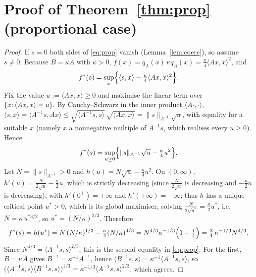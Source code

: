 \documentclass{amsart}
\theoremstyle{definition}
\begin{document}
\section{Proof of Theorem~\ref{thm:prop} (proportional case)}

\begin{proof}
If $s=0$ both sides of \eqref{eq:prop} vanish (Lemma~\ref{lem:coerc}), so assume $s\neq0$.
Because $B=\kappa A$ with $\kappa>0$, $f(x)=q_A(x)\,\kappa q_A(x)=\tfrac\kappa4\langle Ax,x\rangle^2$,
and
\[
f^\ast(s)=\sup_{x}\Bigl\{\langle s,x\rangle-\tfrac\kappa4\langle Ax,x\rangle^2\Bigr\}.
\]
Fix the value $u:=\langle Ax,x\rangle\ge0$ and maximise the linear term over $\{x:\langle Ax,x\rangle=u\}$.
By Cauchy--Schwarz in the inner product $\langle A\cdot,\cdot\rangle$,
$\langle s,x\rangle=\langle A^{-1}s,Ax\rangle\le\sqrt{\langle A^{-1}s,s\rangle}\,\sqrt{\langle Ax,x\rangle}
=\|s\|_{A^{-1}}\sqrt{u}$,
with equality for a suitable $x$ (namely $x$ a nonnegative multiple of $A^{-1}s$, which realises
every $u\ge0$).  Hence
\[
f^\ast(s)=\sup_{u\ge0}\Bigl\{\|s\|_{A^{-1}}\sqrt{u}-\tfrac\kappa4 u^2\Bigr\}.
\]
Let $N=\|s\|_{A^{-1}}>0$ and $h(u)=N\sqrt u-\tfrac\kappa4u^2$.  On $(0,\infty)$,
$h'(u)=\tfrac{N}{2\sqrt u}-\tfrac\kappa2 u$, which is strictly decreasing (since
$\frac{N}{2\sqrt u}$ is decreasing and $-\frac\kappa2u$ is decreasing), with $h'(0^+)=+\infty$ and
$h'(+\infty)=-\infty$; thus $h$ has a unique critical point $u^\ast>0$, which is its global
maximiser, solving $\tfrac{N}{2\sqrt{u^\ast}}=\tfrac\kappa2 u^\ast$, i.e.\
$N=\kappa\,u^{\ast 3/2}$, so $u^\ast=(N/\kappa)^{2/3}$.  Therefore
\[
f^\ast(s)=h(u^\ast)=N\,(N/\kappa)^{1/3}-\tfrac\kappa4(N/\kappa)^{4/3}
=N^{4/3}\kappa^{-1/3}\Bigl(1-\tfrac14\Bigr)=\tfrac34\,\kappa^{-1/3}N^{4/3}.
\]
Since $N^{4/3}=\langle A^{-1}s,s\rangle^{2/3}$, this is the second equality in \eqref{eq:prop}.
For the first, $B=\kappa A$ gives $B^{-1}=\kappa^{-1}A^{-1}$, hence
$\langle B^{-1}s,s\rangle=\kappa^{-1}\langle A^{-1}s,s\rangle$, so
$\bigl(\langle A^{-1}s,s\rangle\langle B^{-1}s,s\rangle\bigr)^{1/3}
=\kappa^{-1/3}\langle A^{-1}s,s\rangle^{2/3}$, which agrees.
\end{proof}
\end{document}
